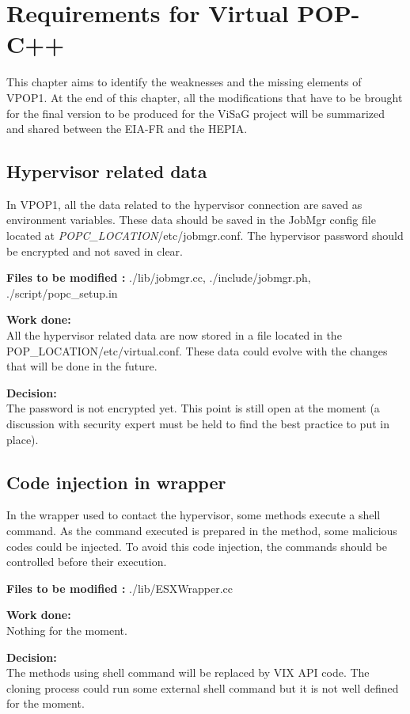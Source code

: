 
\section{Requirements for Virtual POP-C++}
\label{weakness}
This chapter aims to identify the weaknesses and the missing elements of VPOP1. At the end of this chapter, all the modifications that have to be brought for the final version to be produced for the ViSaG project will be summarized and shared between the EIA-FR and the HEPIA.\s


\subsection{Hypervisor related data}
In VPOP1, all the data related to the hypervisor connection are saved as environment variables. These data should be saved in the JobMgr config file located at \textit{POPC\_LOCATION}/etc/jobmgr.conf. The hypervisor password should be encrypted and not saved in clear.\s

\textbf{Files to be modified :} ./lib/jobmgr.cc, ./include/jobmgr.ph, ./script/popc\_setup.in\s

\textbf{Work done:}\\
All the hypervisor related data are now stored in a file located in the POP\_LOCATION/etc/virtual.conf. These data could evolve with the changes that will be done in the future. \s

\textbf{Decision:}\\
The password is not encrypted yet. This point is still open at the moment (a discussion with security expert must be held to find the best practice to put in place).

\subsection{Code injection in wrapper}
In the wrapper used to contact the hypervisor, some methods execute a shell command. As the command executed is prepared in the method, some malicious codes could be injected. To avoid this code injection, the commands should be controlled before their execution.\s

\textbf{Files to be modified : } ./lib/ESXWrapper.cc\s

\textbf{Work done:}\\
Nothing for the moment.\s

\textbf{Decision:}\\
The methods using shell command will be replaced by VIX API code. The cloning process could run some external shell command but it is not well defined for the moment.

